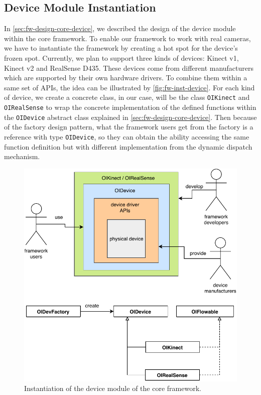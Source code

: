 \subsection{Device Module Instantiation}
\label{sec:fw-inst-device}

In \autoref{sec:fw-design-core-device}, we described the design of the device
module within the core framework. To enable our framework to work with
real cameras, we have to instantiate the framework by creating a hot spot for 
the device's frozen spot.
Currently, we plan to support three kinds of devices: Kinect v1, Kinect v2 and
RealSense D435. These devices come from different manufacturers
which are supported by their own hardware drivers. To combine them within a same set of
APIs, the idea can be illustrated by \autoref{fig:fw-inst-device}. For each
kind of device, we create a concrete class, in our case, will be the class
\texttt{OIKinect} and \texttt{OIRealSense} to wrap the concrete implementation
of the defined functions within the \texttt{OIDevice} abstract class explained
in \autoref{sec:fw-design-core-device}.
Then because of the factory design pattern, what the framework users get from
the factory is a reference with type \texttt{OIDevice}, so they can obtain the
ability accessing the same function definition but with different implementation
from the dynamic dispatch mechanism.

\begin{figure}
    \centering
    \includegraphics[scale=0.8]{figures/framework_inst_device.pdf}
    \caption{Instantiation of the device module of the core framework.}
    \label{fig:fw-inst-device}
\end{figure}

